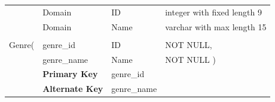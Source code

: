 \documentclass[12pt]{article}
\begin{document}
\begin{table}[H]
\begin{tabular}{l l l l}
		\hline
		&Domain & ID & integer with fixed length 9\\
		&Domain & Name & varchar with max length 15\\&&&
        \\Genre(& genre\_id&ID&NOT NULL,
        \\&genre\_name&Name&NOT NULL\hspace{4PT} )\\
        &\textbf{Primary Key}& genre\_id&\\
        &\textbf{Alternate Key}& genre\_name&\\
        \hline
	\end{tabular}
\end{table}


\begin{table}[H]
\renewcommand\arraystretch{1.1}
\centering


\end{table}
\end{document}
